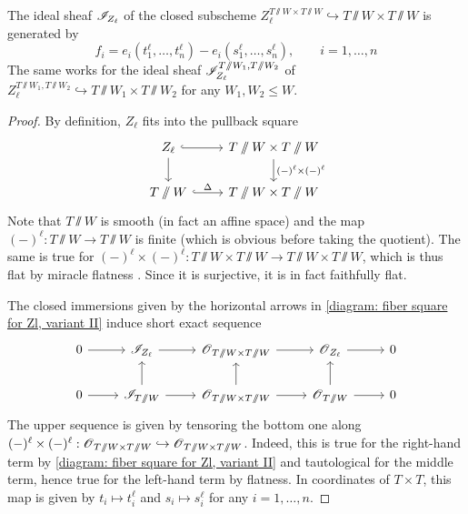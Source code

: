 \begin{lemma}\label{lemma: explicit generators for the ideal sheaf of Zl}
The ideal sheaf $\mathscr{I}_{Z_{\ell}}$ of the closed subscheme $Z^{T\sslash W \times T \sslash W}_{\ell} \hookrightarrow T\sslash W \times T \sslash W$ is generated by
\begin{equation*}
 f_i = e_i(t_1^{\ell}, \dots, t_n^{\ell}) - e_i(s_1^{\ell}, \dots, s_n^{\ell}), \qquad i = 1, \dots, n    
\end{equation*}
The same works for the ideal sheaf $\mathscr{I}_{Z_{\ell}}^{T \sslash W_1, T \sslash W_2}$ of $Z_{\ell}^{T \sslash W_1, T \sslash W_2} \hookrightarrow T \sslash W_1 \times T \sslash W_2$ for any $W_1, W_2 \leq W$.
\end{lemma}
\begin{proof}  

By definition, $Z_{\ell}$ fits into the pullback square
\begin{equation}\label{diagram: fiber square for Zl, variant II}
    \begin{tikzcd}
        Z_{\ell} \arrow[r, hook] \arrow[d] & T\sslash W \times T\sslash W \arrow[d, "(-)^{\ell} \times (-)^{\ell}"] \\
        T\sslash W \arrow[r, hook, "\Delta"] & T\sslash W \times T\sslash W
    \end{tikzcd}
\end{equation}
Note that $T\sslash W$ is smooth (in fact an affine space) and the map $(-)^{\ell}: T\sslash W \to T \sslash W$ is finite (which is obvious before taking the quotient). The same is true for $(-)^{\ell} \times (-)^{\ell}: T\sslash W \times T\sslash W \to T\sslash W \times T\sslash W$, which is thus flat by miracle flatness \cite[Tag 00R4]{Sta}. Since it is surjective, it is in fact faithfully flat.

The closed immersions given by the horizontal arrows in \eqref{diagram: fiber square for Zl, variant II} induce short exact sequence
\begin{equation*}
\begin{tikzcd}
0 \arrow[r] & \eI_{Z_{\ell}} \arrow[r] & \O_{T\sslash W \times T\sslash W} \arrow[r] & \O_{Z_{\ell}} \arrow[r] & 0 \\
0 \arrow[r] & \eI_{T\sslash W} \arrow[r] \arrow[u] & \O_{T\sslash W \times T\sslash W} \arrow[r] \arrow[u] & \O_{T\sslash W} \arrow[u] \arrow[r] & 0 
\end{tikzcd}
\end{equation*}
The upper sequence is given by tensoring the bottom one along $(-)^{\ell} \times (-)^{\ell}: \operatorname{\mathscr{O}}_{T\sslash W \times T\sslash W} \hookrightarrow \operatorname{\mathscr{O}}_{T\sslash W \times T\sslash W}$. Indeed, this is true for the right-hand term by \eqref{diagram: fiber square for Zl, variant II} and tautological for the middle term, hence true for the left-hand term by flatness. In coordinates of $T \times T$, this map is given by $t_i \mapsto t_i^{\ell}$ and $s_i \mapsto s_i^{\ell}$ for any $i = 1, \dots, n$. 


\end{proof}

